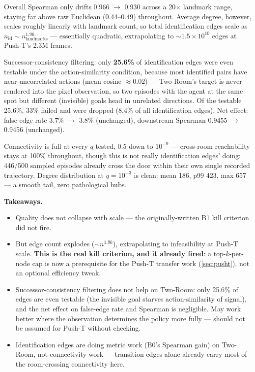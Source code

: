 \documentclass[11pt]{article}
\begin{document}
Overall Spearman only drifts 0.966 $\to$ 0.930 across a 20$\times$ landmark range, staying far
above raw Euclidean (0.44--0.49) throughout. Average degree, however, scales roughly linearly
with landmark count, so total identification edges scale as
$n_{\mathrm{id}} \sim n_{\mathrm{landmarks}}^{1.96}$ --- essentially quadratic, extrapolating to
$\sim 1.5 \times 10^{10}$ edges at Push-T's 2.3M frames.

Successor-consistency filtering: only \textbf{25.6\%} of identification edges were even testable
under the action-similarity condition, because most identified pairs have near-uncorrelated
actions (mean cosine $\approx 0.02$) --- Two-Room's target is never rendered into the pixel
observation, so two episodes with the agent at the same spot but different (invisible) goals head
in unrelated directions. Of the testable 25.6\%, 33\% failed and were dropped (8.4\% of all
identification edges). Net effect: false-edge rate 3.7\% $\to$ 3.8\% (unchanged), downstream
Spearman 0.9455 $\to$ 0.9456 (unchanged).

Connectivity is full at every $q$ tested, $0.5$ down to $10^{-9}$ --- cross-room reachability
stays at 100\% throughout, though this is not really identification edges' doing: 446/500 sampled
episodes already cross the door within their own single recorded trajectory. Degree distribution
at $q=10^{-3}$ is clean: mean 186, p99 423, max 657 --- a smooth tail, zero pathological hubs.

\textbf{Takeaways.}
\begin{itemize}[leftmargin=1.4em,itemsep=2pt]
\item Quality does not collapse with scale --- the originally-written B1 kill criterion did not
fire.
\item But edge count explodes ($\sim n^{1.96}$), extrapolating to infeasibility at Push-T scale.
\textbf{This is the real kill criterion, and it already fired}: a top-$k$-per-node cap is now a
prerequisite for the Push-T transfer work (\cref{sec:pusht}), not an optional efficiency tweak.
\item Successor-consistency filtering does not help on Two-Room: only 25.6\% of edges are even
testable (the invisible goal starves action-similarity of signal), and the net effect on
false-edge rate and Spearman is negligible. May work better where the observation determines the
policy more fully --- should not be assumed for Push-T without checking.
\item Identification edges are doing metric work (B0's Spearman gain) on Two-Room, not
connectivity work --- transition edges alone already carry most of the room-crossing
connectivity here.
\end{itemize}
\end{document}
